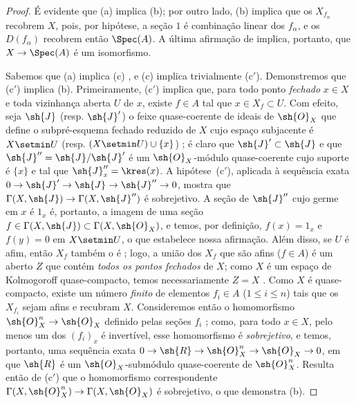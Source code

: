 \documentclass[oneside,10pt]{amsart}
\makeatletter
\renewcommand{\leq}{\leqslant}
\newcommand{\ega@arrow}[2]{\mathchoice{#1}{#2}{#2}{#2}}
\renewcommand{\to}{\ega@arrow{\longrightarrow}{\rightarrow}}
\newcommand{\oldpage}[2][]{\marginnote{\normalfont\footnotesize\textbf{#1}~|~#2}\ignorespaces}
\makeatother
\begin{document}
\begin{proof}
É evidente que (a) implica (b);
por outro lado, (b) implica que os $X_{f_\alpha}$ recobrem $X$, pois, por hipótese, a seção $1$ é combinação linear dos $f_\alpha$, e os $D(f_\alpha)$ recobrem então $\Spec(A)$.
A última afirmação de  implica, portanto, que $X\to\Spec(A)$ é um isomorfismo.

Sabemos que (a) implica (c) , e (c) implica trivialmente (c$'$).
Demonstremos que (c$'$) implica (b).
Primeiramente, (c$'$) implica que, para todo ponto \emph{fechado} $x\in X$ e toda vizinhança aberta $U$ de $x$, existe $f\in A$ tal que $x\in X_f\subset U$.
Com efeito, seja $\sh{J}$ (resp. $\sh{J}'$) o feixe quase-coerente de ideais de $\sh{O}_X$ que define o subpré-esquema fechado reduzido de $X$ cujo espaço subjacente é $X\setmin U$ (resp. $(X\setmin U)\cup\{x\}$) ;
é claro que $\sh{J}'\subset\sh{J}$ e que $\sh{J}''=\sh{J}/\sh{J}'$ é um $\sh{O}_X$-módulo quase-coerente cujo suporte é $\{x\}$ e tal que $\sh{J}_x''=\kres(x)$.
A hipótese~(c$'$), aplicada à sequência exata $0\to\sh{J}'\to\sh{J}\to\sh{J}''\to0$, mostra que $\Gamma(X,\sh{J})\to\Gamma(X,\sh{J}'')$ é sobrejetivo.
A seção de $\sh{J}''$ cujo germe em $x$ é $1_x$ é, portanto, a imagem de uma seção $f\in\Gamma(X,\sh{J})\subset\Gamma(X,\sh{O}_X)$, e temos, por definição, $f(x)=1_x$ e $f(y)=0$ em $X\setmin U$, o que estabelece nossa afirmação.
Além disso, se $U$ é afim, então $X_f$ também o é ; logo, a união dos $X_f$ que são afins ($f\in A$) é um aberto $Z$ que contém \emph{todos os pontos fechados} de $X$;
como $X$ é um espaço de Kolmogoroff quase-compacto, temos necessariamente $Z=X$ .
Como $X$ é quase-compacto, existe um número \emph{finito} de elementos $f_i\in A$ ($1\leq i\leq n$) tais que os $X_{f_i}$ sejam afins e recubram $X$.
Consideremos então o homomorfismo $\sh{O}_X^n\to\sh{O}_X$ definido pelas seções $f_i$ ;
como, para todo $x\in X$, pelo menos um dos $(f_i)_x$ é invertível, esse homomorfismo é \emph{sobrejetivo}, e temos, portanto, uma sequência exata $0\to\sh{R}\to\sh{O}_X^n\to\sh{O}_X\to0$, em que $\sh{R}$ é um $\sh{O}_X$-submódulo quase-coerente de $\sh{O}_X^n$.
Resulta então
\oldpage[II]{98}
de (c$'$) que o homomorfismo correspondente $\Gamma(X,\sh{O}_X^n)\to\Gamma(X,\sh{O}_X)$ é sobrejetivo, o que demonstra (b).


\end{proof}
\end{document}
